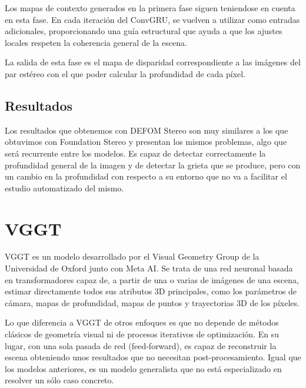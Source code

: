 Los mapas de contexto generados en la primera fase siguen teniendose en cuenta en esta fase. En cada iteración del ConvGRU, se vuelven a utilizar como entradas adicionales, proporcionando una guía estructural que ayuda a que los ajustes locales respeten la coherencia general de la escena.

La salida de esta fase es el mapa de disparidad correspondiente a las imágenes del par estéreo con el que poder calcular la profundidad de cada píxel.

\subsection{Resultados}
Los resultados que obtenemos con DEFOM Stereo son muy similares a los que obtuvimos con Foundation Stereo y presentan los mismos problemas, algo que será recurrente entre los modelos. Es capaz de detectar correctamente la profundidad general de la imagen y de detectar la grieta que se produce, pero con un cambio en la profundidad con respecto a su entorno que no va a facilitar el estudio automatizado del mismo.


\section{VGGT}
VGGT es un modelo desarrollado por el Visual Geometry Group de la Universidad de Oxford junto con Meta AI. Se trata de una red neuronal basada en transformadores capaz de, a partir de una o varias de imágenes de una escena, estimar directamente todos sus atributos 3D principales, como los parámetros de cámara, mapas de profundidad, mapas de puntos y trayectorias 3D de los píxeles.

Lo que diferencia a VGGT de otros enfoques es que no depende de métodos clásicos de geometría visual ni de procesos iterativos de optimización. En su lugar, con una sola pasada de red (feed-forward), es capaz de reconstruir la escena obteniendo unos resultados que no necesitan post-procesamiento. Igual que los modelos anteriores, es un modelo generalista que no está especializado en resolver un sólo caso concreto.

